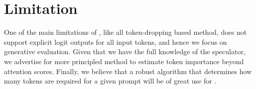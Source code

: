 \section{Limitation}

One of the main limitations of \ours{}, like all token-dropping based method, does not support explicit logit outputs for all input tokens, and hence we focus on generative evaluation. Given that we have the full knowledge of the speculator, we advertise for more principled method to estimate token importance beyond attention scores. Finally, we believe that a robust algorithm that determines how many tokens are required for a given prompt will be of great use for \ours{}. 